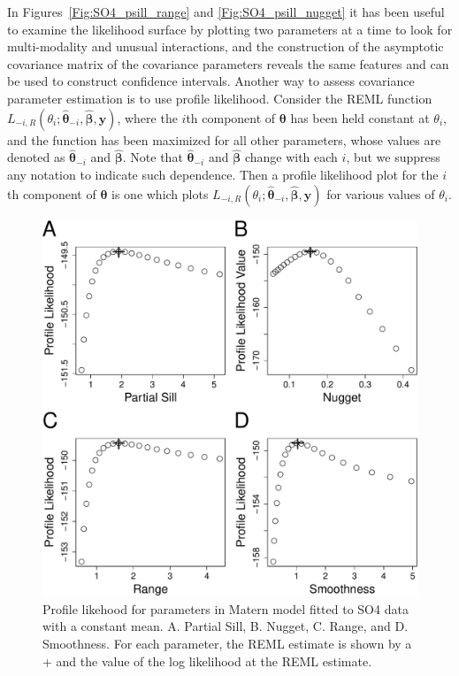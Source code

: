 \documentclass[12pt, titlepage]{article}
\begin{document}
In Figures~\ref{Fig:SO4_psill_range} and \ref{Fig:SO4_psill_nugget} it has been useful to examine the likelihood surface by plotting two parameters at a time to look for multi-modality and unusual interactions, and the construction of the asymptotic covariance matrix of the covariance parameters reveals the same features and can be used to construct confidence intervals.  Another way to assess covariance parameter estimation is to use profile likelihood.  Consider the REML function $L_{-i,R}(\theta_{i};\hat{\boldsymbol{\theta}}_{-i},\hat{\boldsymbol{\beta}},\mathbf{y})$, where the $i$th component of $\boldsymbol{\theta}$ has been held constant at $\theta_{i}$, and the function has been maximized for all other parameters, whose values are denoted as $\hat{\boldsymbol{\theta}}_{-i}$ and $\hat{\boldsymbol{\beta}}$.  Note that $\hat{\boldsymbol{\theta}}_{-i}$ and $\hat{\boldsymbol{\beta}}$ change with each $i$, but we suppress any notation to indicate such dependence. Then a profile likelihood plot for the $i$th component of $\boldsymbol{\theta}$ is one which plots $L_{-i,R}(\theta_{i};\hat{\boldsymbol{\theta}}_{-i},\hat{\boldsymbol{\beta}},\mathbf{y})$ for various values of $\theta_{i}$. 
\begin{figure}[H]
  \begin{center}
	    \includegraphics[width=.8\linewidth]{Matern_SO4}
  \end{center}
  \caption{Profile likehood for parameters in Matern model fitted to SO4 data with a constant mean. A. Partial Sill, B. Nugget, C. Range, and D. Smoothness.  For each parameter, the REML estimate is shown by a + and the value of the log likelihood at the REML estimate. \label{Fig:Matern_SO4}}
\end{figure}
\end{document}
